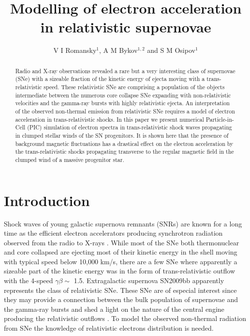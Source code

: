 \documentclass[a4paper]{jpconf}
\begin{document}
\title{Modelling of electron acceleration in relativistic supernovae}

\author{V I Romansky$^{1}$, A M Bykov$^{1,2}$ and S M Osipov$^1$}

\address{$^1$ Ioffe Institute, 26 Politekhnicheskaya st., St. Petersburg 194021, Russia}
\address{$^2$ Peter the Great St. Petersburg Polytechnic University, 29 Politekhnicheskaya st., St. Petersburg 195251, Russia}


\begin{abstract}
Radio and X-ray observations revealed a rare but a very interesting class of supernovae (SNe) with a sizeable fraction of the kinetic  energy of ejecta moving with a trans-relativistic speed.  These relativistic SNe are comprising a population of the objects intermediate between the numerous core collapse SNe expanding with non-relativistic velocities and the gamma-ray bursts with highly relativistic ejecta.  An interpretation of the observed non-thermal emission from relativistic SNe requires a model of electron acceleration in trans-relativistic shocks. In this paper we present numerical Particle-in-Cell (PIC) simulation of electron spectra in trans-relativistic shock waves propagating in clumped stellar winds of the SN progenitors. It is shown here that the presence of background magnetic fluctuations has a drastical effect on the electron acceleration by the trans-relativistic shocks propagating transverse to the regular magnetic field in the clumped wind of a massive progenitor star. 
\end{abstract}
\section{Introduction}


Shock waves of young galactic supernova remnants (SNRs) are known for a long time as the efficient electron accelerators producing synchrotron radiation observed from the radio to X-rays \cite{GS64,Helder12}. While most of the SNe both thermonuclear and core collapsed are ejecting most of their kinetic energy in the shell moving with typical speed below 10,000 km/s, there are a few SNe 
where apparently a sizeable part of the kinetic energy was in the form of trans-relativistic outflow with the 4-speed $\gamma \beta \sim$ 1.5. Extragalactic supernova SN2009bb \cite{2010Natur.463..513S}  apparently represents the class of relativistic SNe. These SNe are of especial interest since they may provide a connection between the bulk population of supernovae and the gamma-ray bursts and shed a light on the nature of the central engine producing the relativistic outflows \cite{Margutti2014,2016ApJ...832..108M}. To model the observed non-thermal radiation from SNe  \cite{1998ApJ...499..810C} the knowledge 
of relativistic electrons distribution is needed.   
\end{document}
